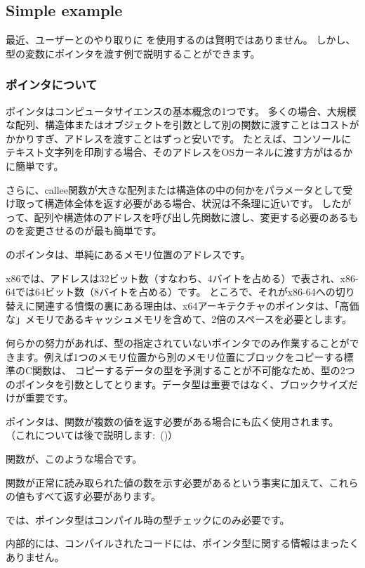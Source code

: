 \subsection{Simple example}



最近、ユーザーとのやり取りに \scanf を使用するのは賢明ではありません。 
しかし、 \Tint 型の変数にポインタを渡す例で説明することができます。

\subsubsection{ポインタについて}
\myindex{\CLanguageElements!\Pointers}

ポインタはコンピュータサイエンスの基本概念の1つです。
多くの場合、大規模な配列、構造体またはオブジェクトを引数として別の関数に渡すことはコストがかかりすぎ、アドレスを渡すことはずっと安いです。
たとえば、コンソールにテキスト文字列を印刷する場合、そのアドレスを\ac{OS}カーネルに渡す方がはるかに簡単です。

さらに、\gls{callee}関数が大きな配列または構造体の中の何かをパラメータとして受け取って構造体全体を返す必要がある場合、状況は不条理に近いです。
したがって、配列や構造体のアドレスを呼び出し先関数に渡し、変更する必要のあるものを変更させるのが最も簡単です。

\CCpp のポインタは、単純にあるメモリ位置のアドレスです。

x86では、アドレスは32ビット数（すなわち、4バイトを占める）で表され、x86-64では64ビット数（8バイトを占める）です。
ところで、それがx86-64への切り替えに関連する憤慨の裏にある理由は、x64アーキテクチャのポインタは、「高価な」メモリであるキャッシュメモリを含めて、2倍のスペースを必要とします。

何らかの努力があれば、型の指定されていないポインタでのみ作業することができます。例えば1つのメモリ位置から別のメモリ位置にブロックをコピーする標準のC関数は、
コピーするデータの型を予測することが不可能なため、型の2つのポインタを引数としてとります。データ型は重要ではなく、ブロックサイズだけが重要です。

ポインタは、関数が複数の値を返す必要がある場合にも広く使用されます。
（これについては後で説明します:~()）

\scanf 関数が、このような場合です。

関数が正常に読み取られた値の数を示す必要があるという事実に加えて、これらの値もすべて返す必要があります。

\CCpp では、ポインタ型はコンパイル時の型チェックにのみ必要です。

内部的には、コンパイルされたコードには、ポインタ型に関する情報はまったくありません。





